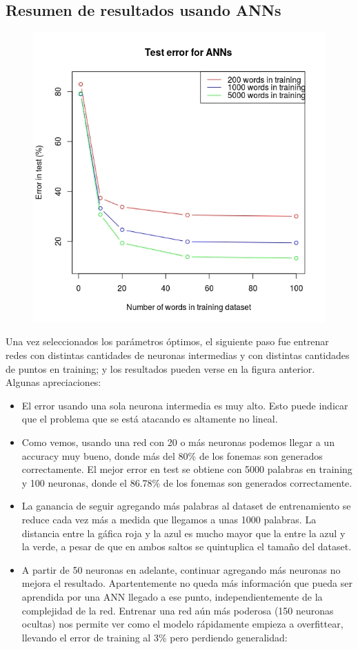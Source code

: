 \documentclass[paper=a4, fontsize=11pt]{scrartcl} %
\numberwithin{equation}{section} %
\numberwithin{figure}{section} %
\numberwithin{table}{section} %
\begin{document}
\subsection{Resumen de resultados usando ANNs}

\begin{figure}[h!]
\centering
\includegraphics[width=112mm]{imgs/annresults.jpg}
\end{figure}

Una vez seleccionados los parámetros óptimos, el siguiente paso fue entrenar redes con distintas cantidades de neuronas intermedias y con distintas cantidades de puntos en training; y los resultados pueden verse en la figura anterior. \\

Algunas apreciaciones:

\begin{itemize}
\item El error usando una sola neurona intermedia es muy alto. Esto puede indicar que el problema que se está atacando es altamente no lineal.
\item Como vemos, usando una red con 20 o más neuronas podemos llegar a un accuracy muy bueno, donde más del 80\% de los fonemas son generados correctamente. El mejor error en test se obtiene con 5000 palabras en training y 100 neuronas, donde el 86.78\% de los fonemas son generados correctamente.
\item La ganancia de seguir agregando más palabras al dataset de entrenamiento se reduce cada vez más a medida que llegamos a unas 1000 palabras. La distancia entre la gáfica roja y la azul es mucho mayor que la entre la azul y la verde, a pesar de que en ambos saltos se quintuplica el tamaño del dataset.
\item A partir de 50 neuronas en adelante, continuar agregando más neuronas no mejora el resultado. Apartentemente no queda más información que pueda ser aprendida por una ANN llegado a ese punto, independientemente de la complejidad de la red. Entrenar una red aún más poderosa (150 neuronas ocultas) nos permite ver como el modelo rápidamente empieza a overfittear, llevando el error de training al 3\% pero perdiendo generalidad:
\end{itemize}
\end{document}
